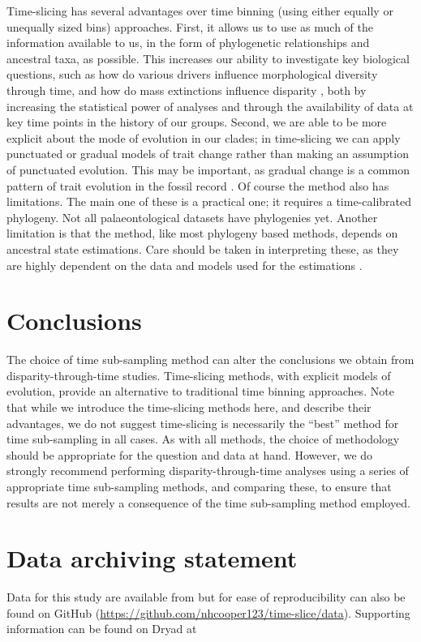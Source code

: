\documentclass[12pt,a4paper]{article}
\begin{document}
Time-slicing has several advantages over time binning (using either equally or unequally sized bins) approaches.
First, it allows us to use as much of the information available to us, in the form of phylogenetic relationships and ancestral taxa, as possible. 
This increases our ability to investigate key biological questions, such as how do various drivers influence morphological diversity through time, and how do mass extinctions influence disparity \citep{Brusatte12092008,Foote29111996,friedmanexplosive2010}, both by increasing the statistical power of analyses and through the availability of data at key time points in the history of our groups.
Second, we are able to be more explicit about the mode of evolution in our clades; in time-slicing we can apply punctuated or gradual models of trait change rather than making an assumption of punctuated evolution.
This may be important, as gradual change is a common pattern of trait evolution in the fossil record \citep{Hunt20112007}.
Of course the method also has limitations.
The main one of these is a practical one; it requires a time-calibrated phylogeny.
Not all palaeontological datasets have phylogenies yet.
Another limitation is that the method, like most phylogeny based methods, depends on ancestral state estimations.
Care should be taken in interpreting these, as they are highly dependent on the data and models used for the estimations \citep{Slateretal2012,doi:10.1080/10635150801910451}.

\section{Conclusions}
The choice of time sub-sampling method can alter the conclusions we obtain from disparity-through-time studies. 
Time-slicing methods, with explicit models of evolution, provide an alternative to traditional time binning approaches.
Note that while we introduce the time-slicing methods here, and describe their advantages, we do not suggest time-slicing is necessarily the ``best'' method for time sub-sampling in all cases. 
As with all methods, the choice of methodology should be appropriate for the question and data at hand.
However, we do strongly recommend performing disparity-through-time analyses using a series of appropriate time sub-sampling methods, and comparing these, to ensure that results are not merely a consequence of the time sub-sampling method employed. 

\section{Data archiving statement}
Data for this study are available from \cite{dryad_n2g80,dryad_6hb7j,dryad_84t75,beckancient2014} but for ease of reproducibility can also be found on GitHub (\url{https://github.com/nhcooper123/time-slice/data}). %
Supporting information can be found on Dryad at %
\end{document}
